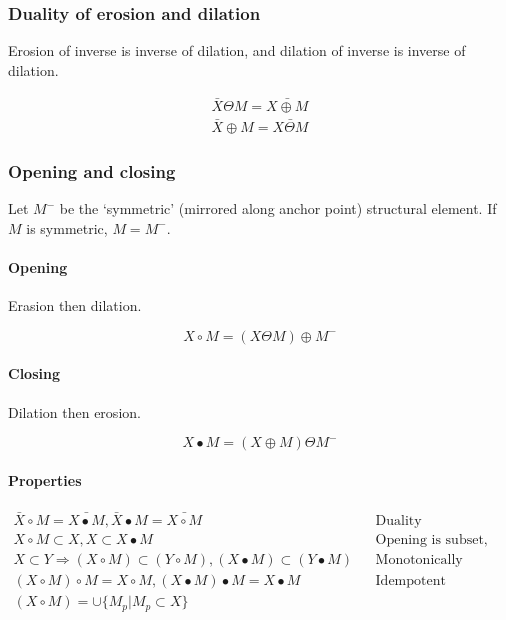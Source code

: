 \subsubsection{Duality of erosion and dilation}

Erosion of inverse is inverse of dilation, and dilation of inverse is inverse
of dilation.

\begin{align*}
		\bar{X} \Theta M = \bar{X \oplus M} \\
		\bar{X} \oplus M = \bar{X \Theta M}
\end{align*}

\subsubsection{Opening and closing}

Let $M^{-}$ be the `symmetric' (mirrored along anchor point) structural
element. If $M$ is symmetric, $M = M^{-}$.

\paragraph{Opening}

Erasion then dilation.

\[
		X \circ M = (X \Theta M) \oplus M^{-}
\]

\paragraph{Closing}

Dilation then erosion.

\[
		X \bullet M = (X \oplus M) \Theta M^{-}
\]

\paragraph{Properties}

\begin{align*}
		\bar{X} \circ M = \bar{X \bullet M}, \bar{X} \bullet M = \bar{X \circ M} && \text{Duality} \\
		X \circ M \subset X, X \subset X \bullet M && \text{Opening is subset, closing is superset of image} \\
		X \subset Y \Rightarrow (X \circ M) \subset (Y \circ M), (X \bullet M) \subset (Y \bullet M) && \text{Monotonically increasing} \\
		(X \circ M) \circ M = X \circ M, (X \bullet M) \bullet M = X \bullet M && \text{Idempotent} \\
		(X \circ M) = \cup \{M_p | M_p \subset X\}
\end{align*}

